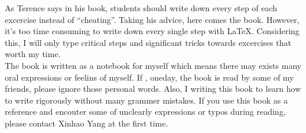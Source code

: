 As Terence says in his book, students should write down every step of each excercise instead of ``cheating''. Taking his advice, here comes the book. However, it's too time consuming to write down every single step with \LaTeX. Considering this, I will only type critical steps and significant tricks towards excercises that worth my time.\\The book is written as a notebook for myself which means there may exists many oral expressions or feelins of myself. If , oneday, the book is read by some of my friends, please ignore those personal words. Also, I writing this book to learn how to write rigorously without many grammer mistakes. If you use this book as a reference and encouter some of unclearly expressions or typos during reading, please contact Xinhao Yang at the first time.
